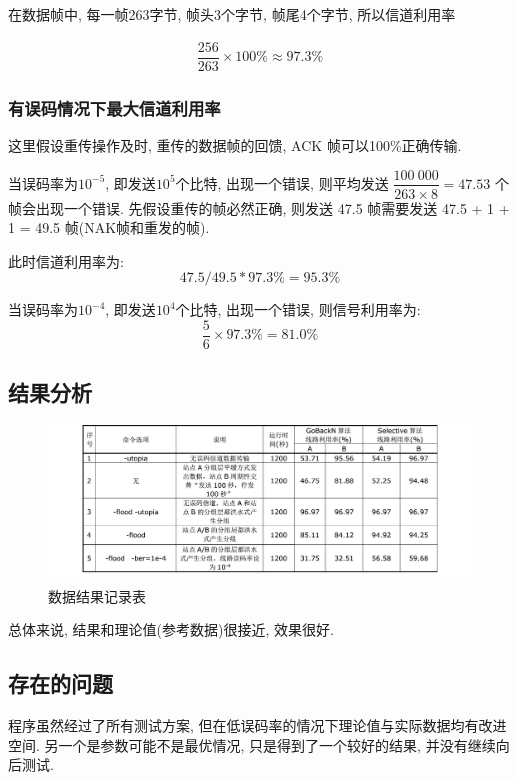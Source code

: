 \par 在数据帧中, 每一帧263字节, 帧头3个字节, 帧尾4个字节, 所以信道利用率

\begin{align*}
  \dfrac{256}{263} \times 100 \% \approx 97.3\%
\end{align*}

\subsubsection{有误码情况下最大信道利用率}

\par 这里假设重传操作及时, 重传的数据帧的回馈, ACK 帧可以100\%正确传输.
\par 当误码率为$10^{-5}$, 即发送$10^5$个比特, 出现一个错误, 则平均发送଴$\dfrac{100\ 000}{263\times 8} = 47.53$
个帧会出现一个错误. 先假设重传的帧必然正确, 则发送 47.5 帧需要发送 47.5 + 1 + 1 = 49.5 帧(NAK帧和重发的帧).
\par 此时信道利用率为:
\[
  47.5 / 49.5 * 97.3 \% = 95.3\%
\]
\par 当误码率为$10^{-4}$, 即发送$10^4$个比特, 出现一个错误, 则信号利用率为:
\[
  \dfrac{5}{6} \times 97.3 \% = 81.0 \%
\]

\subsection{结果分析}

\begin{figure}[h]
  \centering
  \includegraphics[width=1\textwidth]{figure/data.png}
  \caption*{数据结果记录表}
  \label{fig:data}
\end{figure}

\par 总体来说, 结果和理论值(参考数据)很接近, 效果很好.

\subsection{存在的问题}

\par 程序虽然经过了所有测试方案, 但在低误码率的情况下理论值与实际数据均有改进空间. 另一个是参数可能不是最优情况, 只是得到了一个较好的结果, 并没有继续向后测试.

